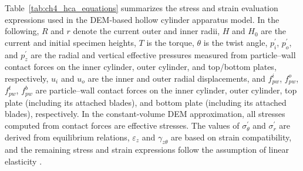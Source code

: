 \documentclass[../main]{subfiles}
\begin{document}
Table~\ref{tab:ch4_hca_equations} summarizes the stress and strain evaluation expressions used in the DEM-based hollow cylinder apparatus model. In the following, $R$ and $r$ denote the current outer and inner radii, $H$ and $H_0$ are the current and initial specimen heights, $T$ is the torque, $\theta$ is the twist angle, $p_i^{\prime}$, $p_o^{\prime}$, and $p_z^{\prime}$ are the radial and vertical effective pressures measured from particle--wall contact forces on the inner cylinder, outer cylinder, and top/bottom plates, respectively, $u_i$ and $u_o$ are the inner and outer radial displacements, and $f_{pw}^{i}$, $f_{pw}^{o}$, $f_{pw}^{t}$, $f_{pw}^{b}$ are particle--wall contact forces on the inner cylinder, outer cylinder, top plate (including its attached blades), and bottom plate (including its attached blades), respectively. In the constant-volume DEM approximation, all stresses computed from contact forces are effective stresses. The values of $\sigma_\theta^{\prime}$ and $\sigma_r^{\prime}$ are derived from equilibrium relations, $\varepsilon_z$ and $\gamma_{z\theta}$ are based on strain compatibility, and the remaining stress and strain expressions follow the assumption of linear elasticity \citep{Hight1983}.
\end{document}
